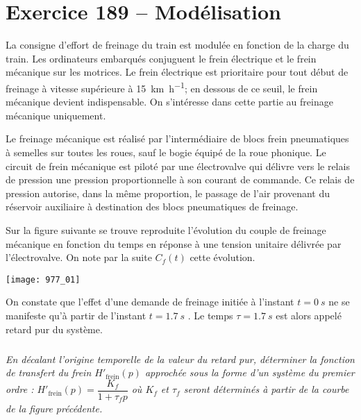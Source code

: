 \section*{Exercice 189 -- Modélisation}
\setcounter{exo}{0}


La consigne d’effort de freinage du train est modulée en fonction de la charge du train. Les ordinateurs
embarqués conjuguent le frein électrique et le frein mécanique sur les motrices. Le frein électrique est
prioritaire pour tout début de freinage à vitesse supérieure à \SI{15}{km.h^{-1}}; en dessous de ce seuil, le frein
mécanique devient indispensable. On s’intéresse dans cette partie au freinage mécanique uniquement.

Le freinage mécanique est réalisé par l’intermédiaire de blocs frein pneumatiques à semelles sur toutes les
roues, sauf le bogie équipé de la roue phonique. Le circuit de frein mécanique est piloté par une électrovalve
qui délivre vers le relais de pression une pression proportionnelle à son courant de commande. Ce relais de
pression autorise, dans la même proportion, le passage de l’air provenant du réservoir auxiliaire à
destination des blocs pneumatiques de freinage.

Sur la figure suivante se trouve reproduite l’évolution du couple de freinage mécanique en fonction du temps en
réponse à une tension unitaire délivrée par l’électrovalve. On note par la suite $C_f (t)$ cette évolution.


\begin{center}
\texttt{[image: 977\_01]}%
\end{center}

On constate que l’effet d’une demande de freinage initiée à l’instant $t = \SI{0}{s}$ ne se manifeste qu’à partir de
l’instant $t =\SI{1,7}{s}$ . Le temps $\tau = \SI{1,7}{s}$ est alors appelé retard pur du système.

\subparagraph{}
\textit{En décalant l’origine temporelle de la valeur du retard pur, déterminer la fonction de transfert
du frein $H'_{\text{frein}} ( p)$ approchée sous la forme d’un système du premier ordre : $H'_{\text{frein}} ( p) = \dfrac{K_f}{1+\tau_f p}$ où $K_f$ et $\tau_f$ seront déterminés à partir de la courbe de la figure précédente.}
\ifprof
\begin{corrige}
\end{corrige}
\else
\fi

